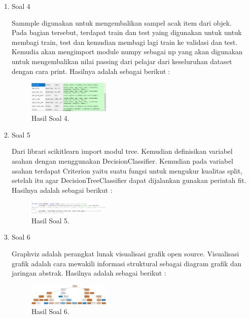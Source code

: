 \begin{enumerate}
	\item Soal 4
	\hfill\break
	
	Sammple digunakan untuk mengembalikan sampel acak item dari objek. Pada bagian tersebut, terdapat train dan test yaing digunakan untuk untuk membagi train, test dan kemudian membagi lagi train ke validasi dan test. Kemudia akan mengimport module numpy sebagai np yang akan digunakan untuk mengembalikan nilai passing dari pelajar dari keseluruhan dataset dengan cara print. Hasilnya adalah sebagai berikut :
	\begin{figure}[H]
	\centering
		\includegraphics[width=4cm]{figures/1174095/tugas2/materi/hasil4.PNG}
		\caption{Hasil Soal 4.}
	\end{figure}

	\item Soal 5
	\hfill\break
	
	Dari librari scikitlearn import modul tree. Kemudian definisikan variabel asahan dengan menggunakan DecisionClassifier. Kemudian pada variabel asahan terdapat Criterion yaitu suatu fungsi untuk mengukur kualitas split, setelah itu agar DecisionTreeClassifier dapat dijalankan gunakan perintah fit. Hasilnya adalah sebagai berikut :
	\begin{figure}[H]
	\centering
		\includegraphics[width=4cm]{figures/1174095/tugas2/materi/hasil5.PNG}
		\caption{Hasil Soal 5.}
	\end{figure}

	\item Soal 6
	\hfill\break
	
	Graphviz adalah perangkat lunak visualisasi grafik open source. Visualisasi grafik adalah cara mewakili informasi struktural sebagai diagram grafik dan jaringan abstrak. Hasilnya adalah sebagai berikut :
	\begin{figure}[H]
	\centering
		\includegraphics[width=4cm]{figures/1174095/tugas2/materi/hasil6.PNG}
		\caption{Hasil Soal 6.}
	\end{figure}


\end{enumerate}
